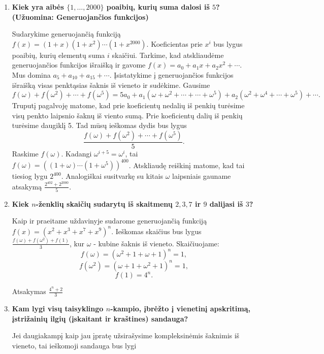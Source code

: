 \begin{enumerate}
\medskip

\item {\bf Kiek yra aibės $\{1,\dots,2000\}$ poaibių, kurių suma dalosi iš $5$? (Užuomina: Generuojančios funkcijos)}

\medskip

Sudarykime generuojančią funkciją $f(x) = (1+x)(1+x^2)\cdots(1+x^2000)$. Koeficientas prie $x^i$ bus lygus poaibių, kurių elementų suma $i$ skaičiui. Tarkime, kad atskliaudėme generuojančios funkcijos išraišką ir gavome $f(x) = a_0 + a_1x + a_2x^2 + \cdots$. Mus domina $a_5+ a_{10} + a_{15} + \cdots.$ Įsistatykime į generuojančios funkcijos išraišką visas penktąsias šaknis iš vieneto ir sudėkime. Gausime $$f(\omega) + f(\omega^2) + \cdots + f(\omega^5) = 5a_0 + a_1(\omega + \omega^2 + \cdots + \cdots + \omega^5) + a_2(\omega^2 + \omega^4 + \cdots + \omega^5) + \cdots.$$
Truputį pagalvoję matome, kad prie koeficientų nedalių iš penkių turėsime visų penkto laipsnio šaknų iš viento sumą. Prie koeficientų dalių iš penkių turėsime daugiklį 5. Tad mūsų ieškomas dydis bus lygus 
$$\frac{f(\omega) + f(\omega^2) + \cdots + f(\omega^5)}{5}.$$
Raskime $f(\omega)$. Kadangi $\omega^{i+5} = \omega^i$, tai $f(\omega) = ((1+\omega)\cdots(1+\omega^5))^{400}$. Atskliaudę reiškinį matome, kad tai tiesiog lygu $2^{400}$. Analogiškai susitvarkę su kitais $\omega$ laipsniais gauname atsakymą 
$\frac{2^{402} + 2^{2000}}{5}$.

\medskip

\item {\bf Kiek $n$-ženklių skaičių sudarytų iš skaitmenų $2,3,7$ ir $9$ dalijasi iš $3$?}

\medskip

Kaip ir praeitame uždavinyje sudarome generuojančią funkciją $f(x) = (x^2 + x^3 + x^7 + x^9)^n.$ Ieškomas skaičius bus lygus $\frac{f(\omega) + f(\omega^2) + f(1)}{3}$, kur $\omega$ - kubine šaknis iš vieneto. Skaičiuojame: 
$$f(\omega) = (\omega^2 + 1 + \omega + 1)^n = 1,$$
$$f(\omega^2) = (\omega + 1 + \omega^2 + 1)^n = 1,$$
$$f(1) = 4^n.$$

Atsakymas $\frac{4^n + 2}{3}$

\medskip

\item {\bf Kam lygi visų taisyklingo $n$-kampio, įbrėžto į vienetinį apskritimą, įstrižainių ilgių (įskaitant ir kraštines) sandauga?}

\medskip

Jei daugiakampį kaip jau įpratę užsirašysime kompleksinėmis šaknimis iš vieneto, tai ieškomoji sandauga bus lygi 



\end{enumerate}
